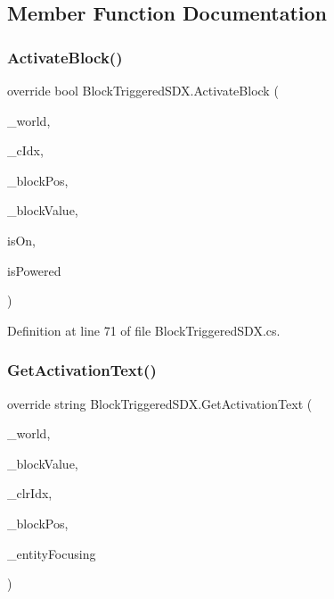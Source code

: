 \subsection{Member Function Documentation}
\mbox{\label{class_block_triggered_s_d_x_a37ee60834670abd0fbe2efe39da887a0}} 
\subsubsection{\texorpdfstring{ActivateBlock()}{ActivateBlock()}}
{\footnotesize\ttfamily override bool Block\+Triggered\+S\+D\+X.\+Activate\+Block (\begin{DoxyParamCaption}\item[{World\+Base}]{\+\_\+world,  }\item[{int}]{\+\_\+c\+Idx,  }\item[{Vector3i}]{\+\_\+block\+Pos,  }\item[{Block\+Value}]{\+\_\+block\+Value,  }\item[{bool}]{is\+On,  }\item[{bool}]{is\+Powered }\end{DoxyParamCaption})}



Definition at line 71 of file Block\+Triggered\+S\+D\+X.\+cs.

\mbox{\label{class_block_triggered_s_d_x_ae8a8c155a8354cc445344d3d35d4cc96}} 
\subsubsection{\texorpdfstring{GetActivationText()}{GetActivationText()}}
{\footnotesize\ttfamily override string Block\+Triggered\+S\+D\+X.\+Get\+Activation\+Text (\begin{DoxyParamCaption}\item[{World\+Base}]{\+\_\+world,  }\item[{Block\+Value}]{\+\_\+block\+Value,  }\item[{int}]{\+\_\+clr\+Idx,  }\item[{Vector3i}]{\+\_\+block\+Pos,  }\item[{Entity\+Alive}]{\+\_\+entity\+Focusing }\end{DoxyParamCaption})}



